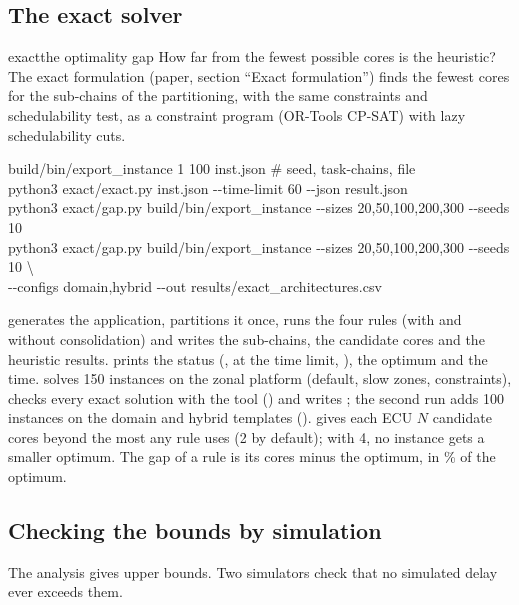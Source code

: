 \subsection{The exact solver}
\label{sec:ex-exact}

\begin{experimentbox}{exact}{the optimality gap}
 How far from the fewest possible cores is the heuristic?
 The exact formulation (paper, section ``Exact formulation'')
finds the fewest cores for the sub-chains of the partitioning, with the
same constraints and schedulability test, as a constraint program
(OR-Tools CP-SAT) with lazy schedulability cuts.
\begin{shell}
build/bin/export\_instance 1 100 inst.json \quad\# seed, task-chains, file\\
python3 exact/exact.py inst.json -{}-time-limit 60 -{}-json result.json\\
python3 exact/gap.py build/bin/export\_instance -{}-sizes 20,50,100,200,300 -{}-seeds 10\\
python3 exact/gap.py build/bin/export\_instance -{}-sizes 20,50,100,200,300 -{}-seeds 10 \textbackslash\\
\quad -{}-configs domain,hybrid -{}-out results/exact\_architectures.csv
\end{shell}
 generates the application, partitions it once,
runs the four rules (with and without consolidation) and writes the
sub-chains, the candidate cores and the heuristic results.
 prints the status (,  at the
time limit, ), the optimum and the time. 
solves 150 instances on the zonal platform (default, slow zones,
constraints), checks every exact solution with the tool
() and writes ;
the second run adds 100 instances on the domain and hybrid templates
().  gives each ECU
$N$ candidate cores beyond the most any rule uses (2 by default); with 4,
no instance gets a smaller optimum.
 The gap of a rule is its cores minus the optimum, in \%
of the optimum.
\end{experimentbox}

\subsection{Checking the bounds by simulation}

The analysis gives upper bounds. Two simulators check that no simulated
delay ever exceeds them.

